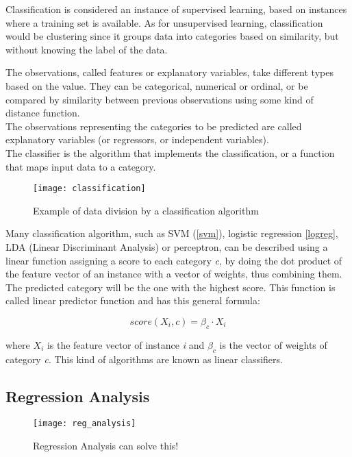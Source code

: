 Classification is considered an instance of supervised learning, based on instances where a training set is available. As for unsupervised learning, classification would be clustering since it groups data into categories based on similarity, but without knowing the label of the data.

The observations, called features or explanatory variables, take different types based on the value. They can be categorical, numerical or ordinal, or be compared by similarity between previous observations using some kind of distance function.\\
The observations representing the categories to be predicted are called explanatory variables (or regressors, or independent variables).\\
The classifier is the algorithm that implements the classification, or a function that maps input data to a category.

\begin{figure}[H]
	\centering
	\texttt{[image: classification]}
	\caption{Example of data division by a classification algorithm}
	\label{fig:classification}
\end{figure}	

Many classification algorithm, such as SVM (\ref{svm}), logistic regression \ref{logreg}, LDA (Linear Discriminant Analysis) or perceptron, can be described using a linear function assigning a score to each category \textit{c}, by doing the dot product of the feature vector of an instance with a vector of weights, thus combining them. The predicted category will be the one with the highest score. This function is called linear predictor function and has this general formula:

\begin{equation}
score(X_i, c) = \beta_c \cdot X_i
\end{equation}

where $X_i$ is the feature vector of instance \textit{i} and $\beta_c$ is the vector of weights of category \textit{c}. This kind of algorithms are known as linear classifiers.

\subsection{Regression Analysis} \label{regression}
\begin{figure}[H]
	\centering
	\texttt{[image: reg\_analysis]}
	\caption{Regression Analysis can solve this! \cite{reg_analisys}}
	\label{fig:reg_analysis}
\end{figure}

